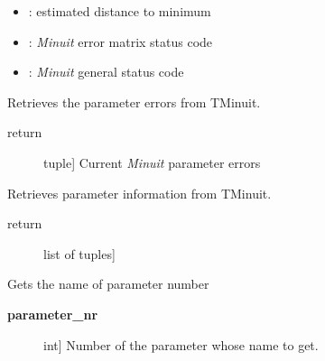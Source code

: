 \documentclass[a4paper,10pt,english]{sphinxmanual}
\begin{document}
\begin{fulllineitems}
\begin{fulllineitems}
\begin{description}
\begin{itemize}
\item {} 
: estimated distance to minimum

\item {} 
: \emph{Minuit} error matrix status code

\item {} 
: \emph{Minuit} general status code

\end{itemize}

\end{description}

\end{fulllineitems}


\begin{fulllineitems}
\label{module_doc:kafe.minuit.Minuit.get_parameter_errors}
Retrieves the parameter errors from TMinuit.
\begin{description}
\item[{return}] \leavevmode{[}tuple{]}
Current \emph{Minuit} parameter errors

\end{description}

\end{fulllineitems}


\begin{fulllineitems}
\label{module_doc:kafe.minuit.Minuit.get_parameter_info}
Retrieves parameter information from TMinuit.
\begin{description}
\item[{return}] \leavevmode{[}list of tuples{]}

\end{description}

\end{fulllineitems}


\begin{fulllineitems}
\label{module_doc:kafe.minuit.Minuit.get_parameter_name}
Gets the name of parameter number 
\begin{description}
\item[{\textbf{parameter\_nr}}] \leavevmode{[}int{]}
Number of the parameter whose name to get.


\end{description}
\end{fulllineitems}
\end{fulllineitems}
\end{document}

